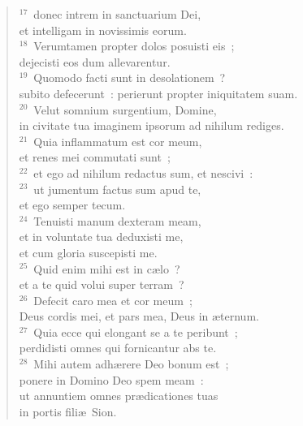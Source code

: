 \begin{verse}
${}^{17}$~donec intrem in sanctuarium Dei,\\ et intelligam in novissimis eorum.\\
${}^{18}$~Verumtamen propter dolos posuisti eis~;\\ dejecisti eos dum allevarentur.\\
${}^{19}$~Quomodo facti sunt in desolationem~?\\ subito defecerunt~: perierunt propter iniquitatem suam.\\
${}^{20}$~Velut somnium surgentium, Domine,\\ in civitate tua imaginem ipsorum ad nihilum rediges.\\
${}^{21}$~Quia inflammatum est cor meum,\\ et renes mei commutati sunt~;\\
${}^{22}$~et ego ad nihilum redactus sum, et nescivi~:\\
${}^{23}$~ut jumentum factus sum apud te,\\ et ego semper tecum.\\
${}^{24}$~Tenuisti manum dexteram meam,\\ et in voluntate tua deduxisti me,\\ et cum gloria suscepisti me.\\
${}^{25}$~Quid enim mihi est in c\ae lo~?\\ et a te quid volui super terram~?\\
${}^{26}$~Defecit caro mea et cor meum~;\\ Deus cordis mei, et pars mea, Deus in \ae ternum.\\
${}^{27}$~Quia ecce qui elongant se a te peribunt~;\\ perdidisti omnes qui fornicantur abs te.\\
${}^{28}$~Mihi autem adh\ae rere Deo bonum est~;\\ ponere in Domino Deo spem meam~:\\ ut annuntiem omnes pr\ae dicationes tuas\\ in portis fili\ae\ Sion.\end{verse}



